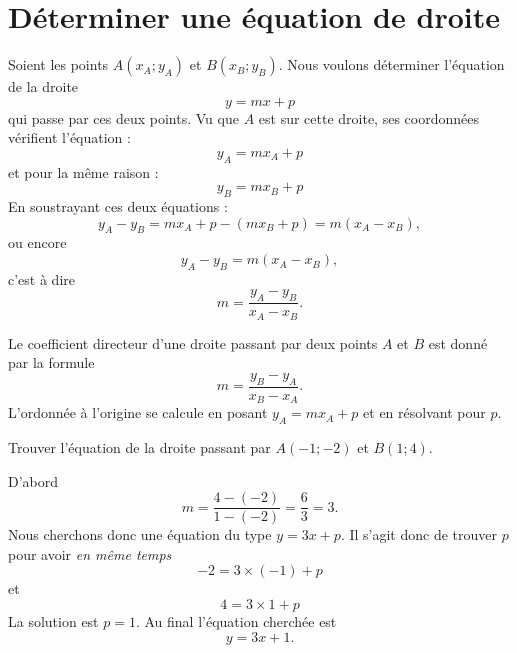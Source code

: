 \section{Déterminer une équation de droite}

Soient les points \( A(x_A;y_A)\) et \( B(x_B;y_B)\). Nous voulons déterminer l'équation de la droite
\begin{equation}
    y=mx+p
\end{equation}
qui passe par ces deux points. Vu que \( A\) est sur cette droite, ses coordonnées vérifient l'équation :
\begin{equation}
    y_A=mx_A+p
\end{equation}
et pour la même raison :
\begin{equation}
    y_B=mx_B+p
\end{equation}
En soustrayant ces deux équations :
\begin{equation}
    y_A-y_B=  mx_A+p-(mx_B+p)=m(x_A-x_B),
\end{equation}
ou encore
\begin{equation}
    y_A-y_B=m(x_A-x_B), 
\end{equation}
c'est à dire
\begin{equation}
    m=\frac{ y_A-y_B }{ x_A-x_B }.
\end{equation}

\begin{Aretenir}
    Le coefficient directeur d'une droite passant par deux points \( A\) et \( B\) est donné par la formule
    \begin{equation}
        m=\frac{ y_B-y_A }{ x_B-x_A }.
    \end{equation}
    L'ordonnée à l'origine se calcule en posant \( y_A=mx_A+p\) et en résolvant pour \( p\).
\end{Aretenir}

\begin{example}
    Trouver l'équation de la droite passant par \( A(-1;-2)\) et \( B(1;4)\).

    D'abord
    \begin{equation}
        m=\frac{ 4-(-2) }{ 1-(-2) }=\frac{ 6 }{ 3 }=3.
    \end{equation}
    Nous cherchons donc une équation du type \( y=3x+p\). Il s'agit donc de trouver \( p\) pour avoir \emph{en même temps}
    \begin{equation}
            -2=3\times (-1)+p
    \end{equation}
    et
    \begin{equation}
        4=3\times 1+p
    \end{equation}
    La solution est \( p=1\). Au final l'équation cherchée est
    \begin{equation}
        y=3x+1.
    \end{equation}
    
\end{example}


